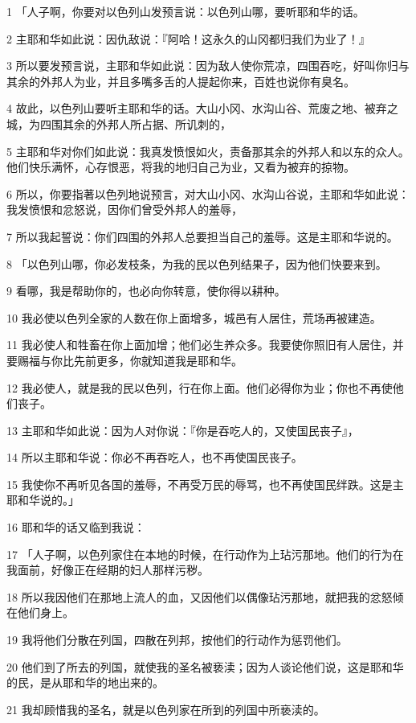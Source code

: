 \par 1 「人子啊，你要对以色列山发预言说：以色列山哪，要听耶和华的话。
\par 2 主耶和华如此说：因仇敌说：『阿哈！这永久的山冈都归我们为业了！』
\par 3 所以要发预言说，主耶和华如此说：因为敌人使你荒凉，四围吞吃，好叫你归与其余的外邦人为业，并且多嘴多舌的人提起你来，百姓也说你有臭名。
\par 4 故此，以色列山要听主耶和华的话。大山小冈、水沟山谷、荒废之地、被弃之城，为四围其余的外邦人所占据、所讥刺的，
\par 5 主耶和华对你们如此说：我真发愤恨如火，责备那其余的外邦人和以东的众人。他们快乐满怀，心存恨恶，将我的地归自己为业，又看为被弃的掠物。
\par 6 所以，你要指著以色列地说预言，对大山小冈、水沟山谷说，主耶和华如此说：我发愤恨和忿怒说，因你们曾受外邦人的羞辱，
\par 7 所以我起誓说：你们四围的外邦人总要担当自己的羞辱。这是主耶和华说的。
\par 8 「以色列山哪，你必发枝条，为我的民以色列结果子，因为他们快要来到。
\par 9 看哪，我是帮助你的，也必向你转意，使你得以耕种。
\par 10 我必使以色列全家的人数在你上面增多，城邑有人居住，荒场再被建造。
\par 11 我必使人和牲畜在你上面加增；他们必生养众多。我要使你照旧有人居住，并要赐福与你比先前更多，你就知道我是耶和华。
\par 12 我必使人，就是我的民以色列，行在你上面。他们必得你为业；你也不再使他们丧子。
\par 13 主耶和华如此说：因为人对你说：『你是吞吃人的，又使国民丧子』，
\par 14 所以主耶和华说：你必不再吞吃人，也不再使国民丧子。
\par 15 我使你不再听见各国的羞辱，不再受万民的辱骂，也不再使国民绊跌。这是主耶和华说的。」
\par 16 耶和华的话又临到我说：
\par 17 「人子啊，以色列家住在本地的时候，在行动作为上玷污那地。他们的行为在我面前，好像正在经期的妇人那样污秽。
\par 18 所以我因他们在那地上流人的血，又因他们以偶像玷污那地，就把我的忿怒倾在他们身上。
\par 19 我将他们分散在列国，四散在列邦，按他们的行动作为惩罚他们。
\par 20 他们到了所去的列国，就使我的圣名被亵渎；因为人谈论他们说，这是耶和华的民，是从耶和华的地出来的。
\par 21 我却顾惜我的圣名，就是以色列家在所到的列国中所亵渎的。
